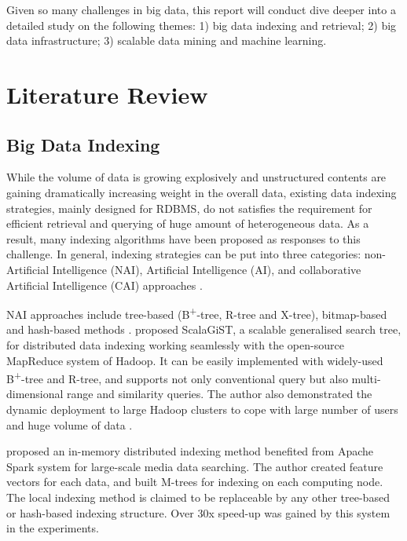\documentclass[conference]{IEEEtran}
\begin{document}
Given so many challenges in big data, this report will conduct dive
deeper into a detailed study on the following themes: 1) big data
indexing and retrieval; 2) big data infrastructure; 3) scalable data
mining and machine learning.

\hypertarget{literature-review}{%
\section{Literature Review}\label{literature-review}}

\hypertarget{big-data-indexing}{%
\subsection{Big Data Indexing}\label{big-data-indexing}}

While the volume of data is growing explosively and unstructured
contents are gaining dramatically increasing weight in the overall data,
existing data indexing strategies, mainly designed for RDBMS, do not
satisfies the requirement for efficient retrieval and querying of huge
amount of heterogeneous data\autocite{gani2016,Pouyanfar2018}. As a
result, many indexing algorithms have been proposed as responses to this
challenge. In general, indexing strategies can be put into three
categories: non-Artificial Intelligence (NAI), Artificial Intelligence
(AI), and collaborative Artificial Intelligence (CAI) approaches
\autocite{gani2016,Pouyanfar2018}.

NAI approaches include tree-based (B\textsuperscript{+}-tree, R-tree and
X-tree), bitmap-based and hash-based methods \autocite{gani2016}.
\textcite{lu2014} proposed ScalaGiST, a scalable generalised search
tree, for distributed data indexing working seamlessly with the
open-source MapReduce system of Hadoop. It can be easily implemented
with widely-used B\textsuperscript{+}-tree and R-tree, and supports not
only conventional query but also multi-dimensional range and similarity
queries. The author also demonstrated the dynamic deployment to large
Hadoop clusters to cope with large number of users and huge volume of
data \autocite{lu2014}.

\textcite{ma2017} proposed an in-memory distributed indexing method
benefited from Apache Spark system for large-scale media data searching.
The author created feature vectors for each data, and built M-trees for
indexing on each computing node. The local indexing method is claimed to
be replaceable by any other tree-based or hash-based indexing structure.
Over 30x speed-up was gained by this system in the experiments.
\end{document}
